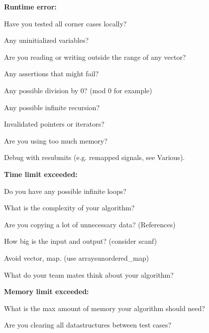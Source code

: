 \textbf{Runtime error:}
\begin{myitemize}
	\item Have you tested all corner cases locally?
	\item Any uninitialized variables?
	\item Are you reading or writing outside the range of any vector?
	\item Any assertions that might fail?
	\item Any possible division by 0? (mod 0 for example)
	\item Any possible infinite recursion?
	\item Invalidated pointers or iterators?
	\item Are you using too much memory?
	\item Debug with resubmits (e.g. remapped signals, see Various).
\end{myitemize}

\textbf{Time limit exceeded:}
\begin{myitemize}
	\item Do you have any possible infinite loops?
	\item What is the complexity of your algorithm?
	\item Are you copying a lot of unnecessary data? (References)
	\item How big is the input and output? (consider scanf)
	\item Avoid vector, map. (use arrays\/unordered\_map)
	\item What do your team mates think about your algorithm?
\end{myitemize}

\textbf{Memory limit exceeded:}
\begin{myitemize}
	\item What is the max amount of memory your algorithm should need?
	\item Are you clearing all datastructures between test cases?
\end{myitemize}

